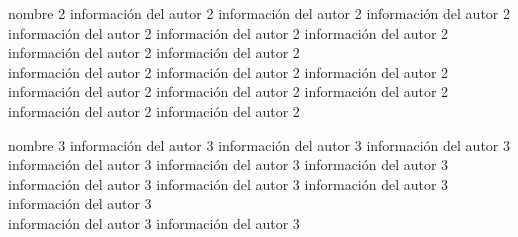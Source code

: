 \documentclass[journal]{IEEEtran}
\begin{document}
\begin{IEEEbiographynophoto}{nombre 2}
información del autor 2 información del autor 2
información del autor 2 información del autor 2
información del autor 2 información del autor 2
información del autor 2 información del autor 2\\
información del autor 2 información del autor 2
información del autor 2 información del autor 2
información del autor 2 información del autor 2
información del autor 2 información del autor 2
\end{IEEEbiographynophoto}


\begin{IEEEbiographynophoto}{nombre 3}
información del autor 3 información del autor 3
información del autor 3 información del autor 3
información del autor 3 información del autor 3\\
información del autor 3 información del autor 3
información del autor 3 información del autor 3\\
información del autor 3 información del autor 3
\end{IEEEbiographynophoto}






\end{document}

